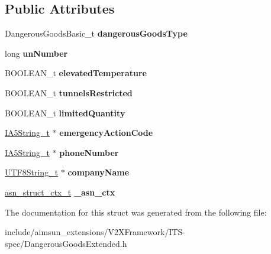 \subsection*{Public Attributes}
\begin{DoxyCompactItemize}
\item 
Dangerous\+Goods\+Basic\+\_\+t {\bfseries dangerous\+Goods\+Type}\hypertarget{structDangerousGoodsExtended_a31b018833d98444df5c248e44b992e86}{}\label{structDangerousGoodsExtended_a31b018833d98444df5c248e44b992e86}

\item 
long {\bfseries un\+Number}\hypertarget{structDangerousGoodsExtended_a925dea7ea368a0ab7a93c17d08c4992e}{}\label{structDangerousGoodsExtended_a925dea7ea368a0ab7a93c17d08c4992e}

\item 
B\+O\+O\+L\+E\+A\+N\+\_\+t {\bfseries elevated\+Temperature}\hypertarget{structDangerousGoodsExtended_a669d04ce4d5917dec9743e300b8e904f}{}\label{structDangerousGoodsExtended_a669d04ce4d5917dec9743e300b8e904f}

\item 
B\+O\+O\+L\+E\+A\+N\+\_\+t {\bfseries tunnels\+Restricted}\hypertarget{structDangerousGoodsExtended_aa74efc0ed77b174a27973c04f5aca88f}{}\label{structDangerousGoodsExtended_aa74efc0ed77b174a27973c04f5aca88f}

\item 
B\+O\+O\+L\+E\+A\+N\+\_\+t {\bfseries limited\+Quantity}\hypertarget{structDangerousGoodsExtended_a0ca1a0c95097ee06a6a4ae08e88b888c}{}\label{structDangerousGoodsExtended_a0ca1a0c95097ee06a6a4ae08e88b888c}

\item 
\hyperlink{structOCTET__STRING}{I\+A5\+String\+\_\+t} $\ast$ {\bfseries emergency\+Action\+Code}\hypertarget{structDangerousGoodsExtended_a8c42f9783ddbfcd4447e710cb38d002c}{}\label{structDangerousGoodsExtended_a8c42f9783ddbfcd4447e710cb38d002c}

\item 
\hyperlink{structOCTET__STRING}{I\+A5\+String\+\_\+t} $\ast$ {\bfseries phone\+Number}\hypertarget{structDangerousGoodsExtended_a169a84dc9995f09525acceaf7325398a}{}\label{structDangerousGoodsExtended_a169a84dc9995f09525acceaf7325398a}

\item 
\hyperlink{structOCTET__STRING}{U\+T\+F8\+String\+\_\+t} $\ast$ {\bfseries company\+Name}\hypertarget{structDangerousGoodsExtended_a6a27e2c6ebf29909d249d621bc0662c4}{}\label{structDangerousGoodsExtended_a6a27e2c6ebf29909d249d621bc0662c4}

\item 
\hyperlink{structasn__struct__ctx__s}{asn\+\_\+struct\+\_\+ctx\+\_\+t} {\bfseries \+\_\+asn\+\_\+ctx}\hypertarget{structDangerousGoodsExtended_af00bb870f3156c5db02151815d76711d}{}\label{structDangerousGoodsExtended_af00bb870f3156c5db02151815d76711d}

\end{DoxyCompactItemize}


The documentation for this struct was generated from the following file\+:\begin{DoxyCompactItemize}
\item 
include/aimsun\+\_\+extensions/\+V2\+X\+Framework/\+I\+T\+S-\/spec/Dangerous\+Goods\+Extended.\+h\end{DoxyCompactItemize}
